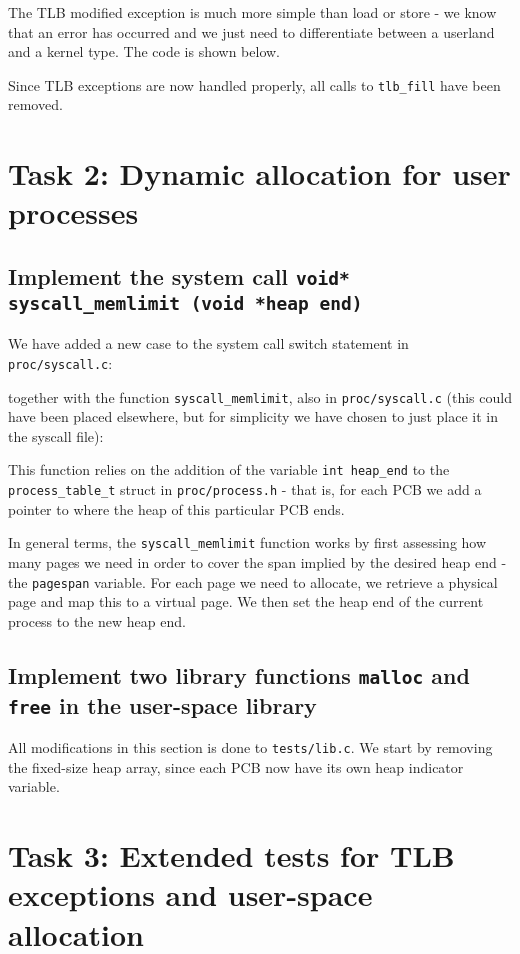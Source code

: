 \documentclass[a4paper,12pt]{article}
\begin{document}
The TLB modified exception is much more simple than load or store - we know that an error has occurred and we just need to differentiate between a userland and a kernel type. The code is shown below. 


Since TLB exceptions are now handled properly, all calls to \texttt{tlb\_fill} have been removed.

\section{Task 2: Dynamic allocation for user processes}

\subsection{Implement the system call \texttt{void* syscall\_memlimit (void *heap end)}}

We have added a new case to the system call switch statement in \texttt{proc/syscall.c}:

together with the function \texttt{syscall\_memlimit}, also in \texttt{proc/syscall.c} (this could have been placed elsewhere, but for simplicity we have chosen to just place it in the syscall file):


This function relies on the addition of the variable \texttt{int heap\_end} to the \texttt{process\_table\_t} struct in \texttt{proc/process.h} - that is, for each PCB we add a pointer to where the heap of this particular PCB ends.

In general terms, the \texttt{syscall\_memlimit} function works by first assessing how many pages we need in order to cover the span implied by the desired heap end - the \texttt{pagespan} variable. For each page we need to allocate, we retrieve a physical page and map this to a virtual page. We then set the heap end of the current process to the new heap end.

\subsection{Implement two library functions \texttt{malloc} and \texttt{free} in the user-space library}

All modifications in this section is done to \texttt{tests/lib.c}. We start by removing the fixed-size heap array, since each PCB now have its own heap indicator variable.




\section{Task 3: Extended tests for TLB exceptions and user-space allocation}
\end{document}
